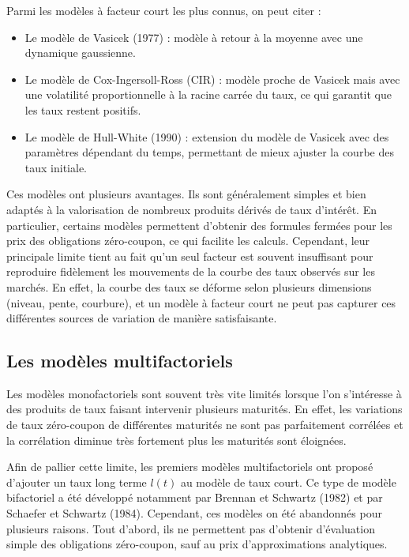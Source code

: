 Parmi les modèles à facteur court les plus connus, on peut citer :
\begin{itemize}
    \item Le modèle de Vasicek (1977) : modèle à retour à la moyenne avec une dynamique gaussienne.
    \item Le modèle de Cox-Ingersoll-Ross (CIR) : modèle proche de Vasicek mais avec une volatilité proportionnelle à la racine carrée du taux, ce qui garantit que les taux restent positifs.
    \item Le modèle de Hull-White (1990) : extension du modèle de Vasicek avec des paramètres dépendant du temps, permettant de mieux ajuster la courbe des taux initiale.
\end{itemize}

Ces modèles ont plusieurs avantages. Ils sont généralement simples et bien adaptés à la valorisation de nombreux produits dérivés de taux d'intérêt. En particulier, certains modèles permettent d'obtenir des formules fermées pour les prix des obligations zéro-coupon, ce qui facilite les calculs.
Cependant, leur principale limite tient au fait  qu'un seul facteur est souvent insuffisant pour reproduire fidèlement les mouvements de la courbe des taux observés sur les marchés. En effet, la courbe des taux se déforme selon plusieurs dimensions (niveau, pente, courbure), et un modèle à facteur court ne peut pas capturer ces différentes sources de variation de manière satisfaisante.

\subsection{Les modèles multifactoriels}

Les modèles monofactoriels sont souvent très vite limités lorsque l'on s'intéresse à des produits de taux faisant intervenir plusieurs maturités. En effet, les variations de taux zéro-coupon de différentes maturités ne sont pas parfaitement corrélées et la corrélation diminue très fortement plus les maturités sont éloignées. 

Afin de pallier cette limite, les premiers modèles multifactoriels ont proposé d'ajouter un taux long terme $l(t)$ au modèle de taux court. Ce type de modèle bifactoriel a été développé notamment par Brennan et Schwartz (1982) et par Schaefer et Schwartz (1984). Cependant, ces modèles on été abandonnés pour plusieurs raisons. Tout d'abord, ils ne permettent pas d'obtenir d'évaluation simple des obligations zéro-coupon, sauf au prix d'approximations analytiques.

